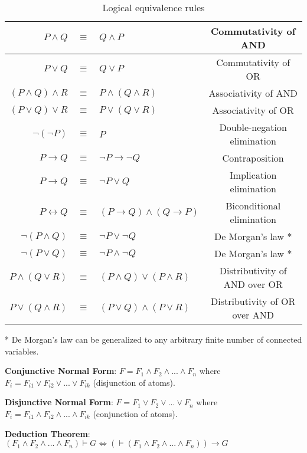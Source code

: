 \documentclass[]{article}
\begin{document}
\begin{table}[h]
	\centering
	\caption{Logical equivalence rules}
	\begin{tabular}{ | r  c  l  c | } 
		\hline
		$P \land Q$ & $\equiv$ & $Q \land P$ & Commutativity of AND\\
		\hline
		$P \lor Q$ & $\equiv$ & $Q \lor P$ & Commutativity of OR\\
		\hline
		$(P \land Q) \land R$ & $\equiv$ & $P \land (Q \land R)$ & Associativity of AND\\
		\hline
		$(P \lor Q) \lor R$ & $\equiv$ & $P \lor (Q \lor R)$ & Associativity of OR\\
		\hline
		$\neg(\neg P)$ & $\equiv$ & $P$ & Double-negation elimination\\
		\hline
		$P \rightarrow Q$ & $\equiv$ & $\neg P \rightarrow \neg Q$ & Contraposition\\
		\hline
		$P \rightarrow Q$ & $\equiv$ & $\neg P \lor Q$ & Implication elimination\\
		\hline
		$P \leftrightarrow Q$ & $\equiv$ & $(P \rightarrow Q) \land (Q \rightarrow P)$ & Biconditional elimination \\
		\hline
		$\neg(P \land Q)$ & $\equiv$ & $\neg P \lor \neg Q$ & De Morgan's law *\\
		\hline
		$\neg(P \lor Q)$ & $\equiv$ & $\neg P \land \neg Q$ & De Morgan's law *\\
		\hline
		$P \land (Q \lor R)$ & $\equiv$ & $(P \land Q) \lor (P \land R)$ & Distributivity of AND over OR\\
		\hline
		$P \lor (Q \land R)$ & $\equiv$ & $(P \lor Q) \land (P \lor R)$ & Distributivity of OR over AND\\
		\hline
	\end{tabular}

	* De Morgan's law can be generalized to any arbitrary finite number of connected variables.
\end{table}

\noindent \textbf{Conjunctive Normal Form}: $F = F_1 \land F_2 \land ... \land F_n $ where $F_i = F_{i1} \lor F_{i2} \lor ... \lor F_{ik} $ (disjunction of atoms).

\noindent \textbf{Disjunctive Normal Form}: $F = F_1 \lor F_2 \lor ... \lor F_n $ where $F_i = F_{i1} \land F_{i2} \land ... \land F_{ik} $ (conjunction of atoms).

\noindent \textbf{Deduction Theorem}: $(F_1 \land F_2 \land ... \land F_n) \models G \iff (\models(F_1 \land F_2 \land ... \land F_n)) \rightarrow G$
\end{document}
